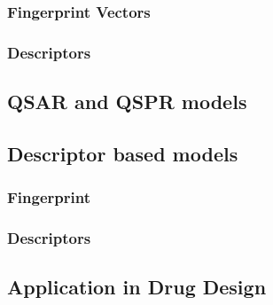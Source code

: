 \subsubsection{Fingerprint Vectors}
\subsubsection{Descriptors}


\subsection{QSAR and QSPR models}
\subsection{Descriptor based models}
\subsubsection{Fingerprint}
\subsubsection{Descriptors}

\subsection{Application in Drug Design}